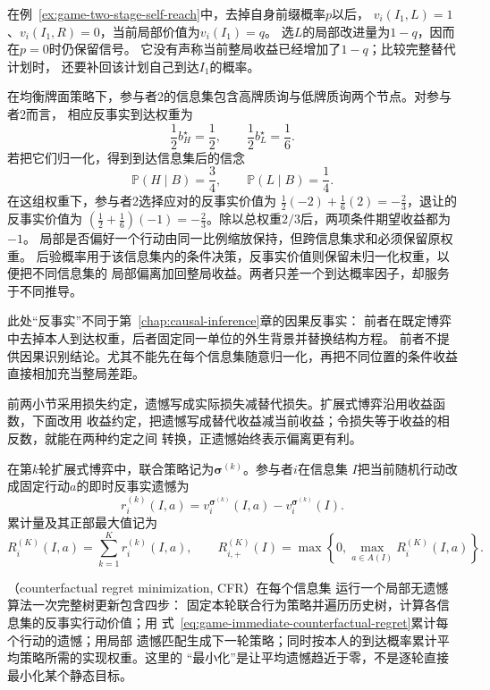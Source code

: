 在例~\ref{ex:game-two-stage-self-reach}中，去掉自身前缀概率$p$以后，
$v_i(I_1,L)=1$、$v_i(I_1,R)=0$，当前局部价值为$v_i(I_1)=q$。
选$L$的局部改进量为$1-q$，因而在$p=0$时仍保留信号。
它没有声称当前整局收益已经增加了$1-q$；比较完整替代计划时，
还要补回该计划自己到达$I_1$的概率。

在均衡牌面策略下，参与者2的信息集包含高牌质询与低牌质询两个节点。对参与者2而言，
相应反事实到达权重为
\[
  \frac12 b_H^\star=\frac12,
  \qquad
  \frac12 b_L^\star=\frac16.
\]
若把它们归一化，得到到达信息集后的信念
\[
  \mathbb{P}(H\mid B)=\frac34,\qquad
  \mathbb{P}(L\mid B)=\frac14.
\]
在这组权重下，参与者2选择应对的反事实价值为
$\frac12(-2)+\frac16(2)=-\frac23$，退让的反事实价值为
$(\frac12+\frac16)(-1)=-\frac23$。除以总权重$2/3$后，两项条件期望收益都为$-1$。
局部是否偏好一个行动由同一比例缩放保持，但跨信息集求和必须保留原权重。
后验概率用于该信息集内的条件决策，反事实价值则保留未归一化权重，以便把不同信息集的
局部偏离加回整局收益。两者只差一个到达概率因子，却服务于不同推导。

此处“反事实”不同于第~\ref{chap:causal-inference}章的因果反事实：
前者在既定博弈中去掉本人到达权重，后者固定同一单位的外生背景并替换结构方程。
前者不提供因果识别结论。尤其不能先在每个信息集随意归一化，再把不同位置的条件收益
直接相加充当整局差距。

前两小节采用损失约定，遗憾写成实际损失减替代损失。扩展式博弈沿用收益函数，下面改用
收益约定，把遗憾写成替代收益减当前收益；令损失等于收益的相反数，就能在两种约定之间
转换，正遗憾始终表示偏离更有利。

在第\(k\)轮扩展式博弈中，联合策略记为\(\bm{\sigma}^{(k)}\)。参与者\(i\)在信息集
\(I\)把当前随机行动改成固定行动\(a\)的即时反事实遗憾为
\begin{equation}
  r_i^{(k)}(I,a)
  =
  v_i^{\bm{\sigma}^{(k)}}(I,a)
  -
  v_i^{\bm{\sigma}^{(k)}}(I).
  \label{eq:game-immediate-counterfactual-regret}
\end{equation}
累计量及其正部最大值记为
\[
  R_i^{(K)}(I,a)
  =
  \sum_{k=1}^{K}r_i^{(k)}(I,a),
  \qquad
  R_{i,+}^{(K)}(I)
  =
  \max\left\{0,\max_{a\in A(I)}R_i^{(K)}(I,a)\right\}.
\]

（counterfactual regret minimization, CFR）在每个信息集
运行一个局部无遗憾算法一次完整树更新包含四步：
固定本轮联合行为策略并遍历历史树，计算各信息集的反事实行动价值；用
式~\eqref{eq:game-immediate-counterfactual-regret}累计每个行动的遗憾；用局部
遗憾匹配生成下一轮策略；同时按本人的到达概率累计平均策略所需的实现权重。这里的
“最小化”是让平均遗憾趋近于零，不是逐轮直接最小化某个静态目标。

